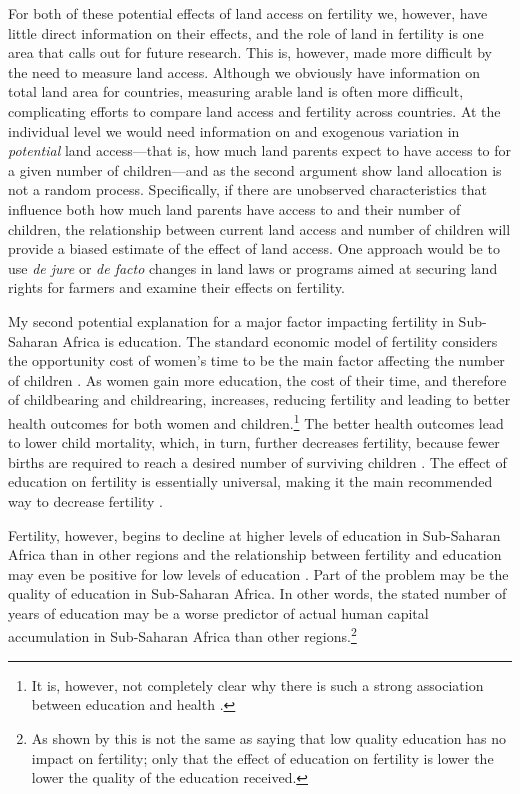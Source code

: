 For both of these potential effects of land access on fertility we, however, have little direct information on their effects, and the role of land in fertility is one area that calls out for future research. This is, however, made more difficult by the need to measure land access. Although we obviously have information on total land area for countries, measuring arable land is often more difficult, complicating efforts to compare land access and fertility across countries. At the individual level we would need information on and exogenous variation in \emph{potential} land access---that is, how much land parents expect to have access to for a given number of children---and as the second argument show land allocation is not a random process. Specifically, if there are unobserved characteristics that influence both how much land parents have access to and their number of children, the relationship between current land access and number of children will provide a biased estimate of the effect of land access. One approach would be to use \emph{de jure} or \emph{de facto} changes in land laws or programs aimed at securing land rights for farmers and examine their effects on fertility.

My second potential explanation for a major factor impacting fertility in Sub-Saharan Africa is education. The standard economic model of fertility considers the opportunity cost of women's time to be the main factor affecting the number of children \citep{becker91}. As women gain more education, the cost of their time, and therefore of childbearing and childrearing, increases, reducing fertility and leading to better health outcomes for both women and children.\footnote{It is, however, not completely clear why there is such a strong association between education and health \citep{Thomas1991,Glewwe1999,Kovsted2002}.} The better health outcomes lead to lower child mortality, which, in turn, further decreases fertility, because fewer births are required to reach a desired number of surviving children \citep{Ainsworth1996}. The effect of education on fertility is essentially universal, making it the main recommended way to decrease fertility \citep{schultz02}.

Fertility, however, begins to decline at higher levels of education in Sub-Saharan Africa than in other regions and the relationship between fertility and education may even be positive for low levels of education \citep{Ainsworth1996,Benefo1996,Thomas1996}. Part of the problem may be the quality of education in Sub-Saharan Africa. In other words, the stated number of years of education may be a worse predictor of actual human capital accumulation in Sub-Saharan Africa than other regions.\footnote{As shown by \citet{Oye2016} this is not the same as saying that low quality education has no impact on fertility; only that the effect of education on fertility is lower the lower the quality of the education received.}

